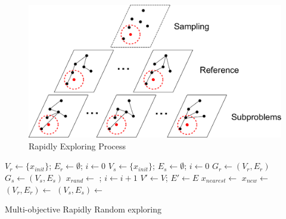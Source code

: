 \documentclass[paper=a4, fontsize=11pt]{scrartcl}
\begin{document}
\begin{figure}
\centering
\includegraphics[width=0.7\linewidth]{./fig/MORRTstar}
\caption{Rapidly Exploring Process}
\label{fig:MORRTstar}
\end{figure}


\begin{algorithm}
\begin{algorithmic}[1]
	\State $ V_{r} \leftarrow \{ x_{init} \} $; $ E_{r} \leftarrow \emptyset $; $ i \leftarrow 0 $
\EndFor
{} 
	\State $ V_{s} \leftarrow \{ x_{init} \} $; $ E_{s} \leftarrow \emptyset $; $ i \leftarrow 0 $
\EndFor
{}
		\State $ G_{r} \leftarrow (V_{r}, E_{r}) $
	\EndFor
		\State $ G_{s} \leftarrow (V_{s}, E_{s}) $
	\EndFor
	\State $ x_{rand} \leftarrow $  ; $ i \leftarrow i + 1 $
	\State $ V' \leftarrow V $; $ E' \leftarrow E $
	\State $ x_{nearest} \leftarrow $ 
	\State $ x_{new} \leftarrow $ 
		\State $ (V_{r}, E_{r}) \leftarrow $ 
		\EndFor
		\State $ (V_{s}, E_{s}) \leftarrow $ 
		\EndFor
	\EndIf
\EndWhile
\end{algorithmic}
\label{alg:rapidly_exploring_process}
\caption{Multi-objective Rapidly Random exploring }
\end{algorithm}
\end{document}
